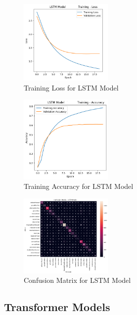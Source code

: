 \begin{figure}[H]
    \centering
    \includegraphics[width=0.4\textwidth]{dl_lstm_trainloss.png}
    \caption{Training Loss for LSTM Model}
    \label{fig:dl_lstm_trainloss}
\end{figure}

\begin{figure}[H]
    \centering
    \includegraphics[width=0.4\textwidth]{dl_lstm_trainaccuracy.png}
    \caption{Training Accuracy for LSTM Model}
    \label{fig:dl_lstm_trainaccuracy}
\end{figure}

\begin{figure}[H]
    \centering
    \includegraphics[width=0.4\textwidth]{dl_lstm_confmat.png}
    \caption{Confusion Matrix for LSTM Model}
    \label{fig:dl_lstm_confmat}
\end{figure}

\subsection{Transformer Models}

